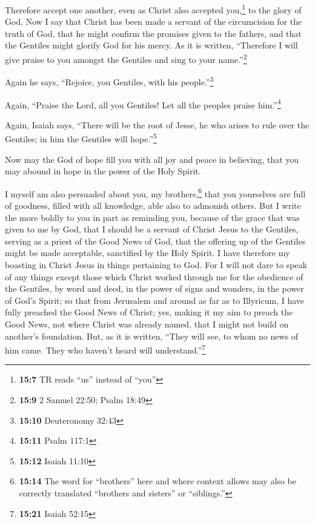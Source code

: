  Therefore accept one another, even as Christ also
accepted you,\footnote{\textbf{15:7} TR reads ``us'' instead of ``you''}
to the glory of God.  Now I say that Christ has been made
a servant of the circumcision for the truth of God, that he might
confirm the promises given to the fathers,  and that the
Gentiles might glorify God for his mercy. As it is written, ``Therefore
I will give praise to you amongst the Gentiles and sing to your
name.''\footnote{\textbf{15:9} 2 Samuel 22:50; Psalm 18:49}

 Again he says, ``Rejoice, you Gentiles, with his
people.''\footnote{\textbf{15:10} Deuteronomy 32:43}

 Again, ``Praise the Lord, all you Gentiles! Let all the
peoples praise him.''\footnote{\textbf{15:11} Psalm 117:1}

 Again, Isaiah says, ``There will be the root of Jesse,
he who arises to rule over the Gentiles; in him the Gentiles will
hope.''\footnote{\textbf{15:12} Isaiah 11:10}

 Now may the God of hope fill you with all joy and peace
in believing, that you may abound in hope in the power of the Holy
Spirit.

 I myself am also persuaded about you, my
brothers,\footnote{\textbf{15:14} The word for ``brothers'' here and
  where context allows may also be correctly translated ``brothers and
  sisters'' or ``siblings.''} that you yourselves are full of goodness,
filled with all knowledge, able also to admonish others. 
But I write the more boldly to you in part as reminding you, because of
the grace that was given to me by God,  that I should be
a servant of Christ Jesus to the Gentiles, serving as a priest of the
Good News of God, that the offering up of the Gentiles might be made
acceptable, sanctified by the Holy Spirit.  I have
therefore my boasting in Christ Jesus in things pertaining to God.
 For I will not dare to speak of any things except those
which Christ worked through me for the obedience of the Gentiles, by
word and deed,  in the power of signs and wonders, in the
power of God's Spirit; so that from Jerusalem and around as far as to
Illyricum, I have fully preached the Good News of Christ;
 yes, making it my aim to preach the Good News, not where
Christ was already named, that I might not build on another's
foundation.  But, as it is written, ``They will see, to
whom no news of him came. They who haven't heard will
understand.''\footnote{\textbf{15:21} Isaiah 52:15}

